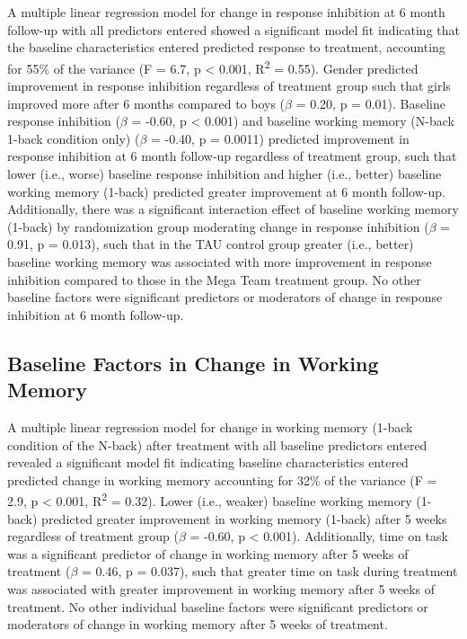 \documentclass[
  letterpaper,
]{ut-thesis}
\begin{document}
A multiple linear regression model for change in response inhibition at
6 month follow-up with all predictors entered showed a significant model
fit indicating that the baseline characteristics entered predicted
response to treatment, accounting for 55\% of the variance (F = 6.7, p
\textless{} 0.001, R\textsuperscript{2} = 0.55). Gender predicted
improvement in response inhibition regardless of treatment group such
that girls improved more after 6 months compared to boys (\(\beta\) =
0.20, p = 0.01). Baseline response inhibition (\(\beta\) = -0.60, p
\textless{} 0.001) and baseline working memory (N-back 1-back condition
only) (\(\beta\) = -0.40, p = 0.0011) predicted improvement in response
inhibition at 6 month follow-up regardless of treatment group, such that
lower (i.e., worse) baseline response inhibition and higher (i.e.,
better) baseline working memory (1-back) predicted greater improvement
at 6 month follow-up. Additionally, there was a significant interaction
effect of baseline working memory (1-back) by randomization group
moderating change in response inhibition (\(\beta\) = 0.91, p = 0.013),
such that in the TAU control group greater (i.e., better) baseline
working memory was associated with more improvement in response
inhibition compared to those in the Mega Team treatment group. No other
baseline factors were significant predictors or moderators of change in
response inhibition at 6 month follow-up.

\subsection{Baseline Factors in Change in Working
Memory}\label{baseline-factors-in-change-in-working-memory}

A multiple linear regression model for change in working memory (1-back
condition of the N-back) after treatment with all baseline predictors
entered revealed a significant model fit indicating baseline
characteristics entered predicted change in working memory accounting
for 32\% of the variance (F = 2.9, p \textless{} 0.001,
R\textsuperscript{2} = 0.32). Lower (i.e., weaker) baseline working
memory (1-back) predicted greater improvement in working memory (1-back)
after 5 weeks regardless of treatment group (\(\beta\) = -0.60, p
\textless{} 0.001). Additionally, time on task was a significant
predictor of change in working memory after 5 weeks of treatment
(\(\beta\) = 0.46, p = 0.037), such that greater time on task during
treatment was associated with greater improvement in working memory
after 5 weeks of treatment. No other individual baseline factors were
significant predictors or moderators of change in working memory after 5
weeks of treatment.
\end{document}
